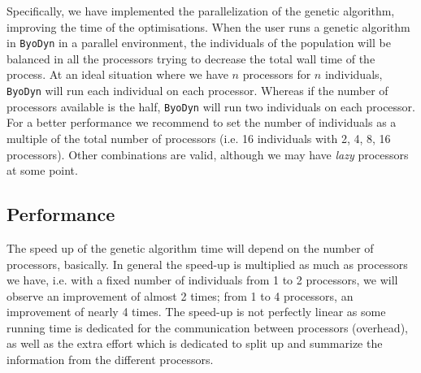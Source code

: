 \documentclass[a4paper, 11pt]{article}
\begin{document}
Specifically, we have implemented the parallelization of the genetic algorithm, improving the time of the optimisations. When the user runs a genetic algorithm in \texttt{ByoDyn} in a parallel environment, the individuals of the population will be balanced in all the processors trying to decrease the total wall time of the process.
At an ideal situation where we have $n$ processors for $n$ individuals, \texttt{ByoDyn} will run each individual on each processor.  
Whereas if the number of processors available is the half, \texttt{ByoDyn} will run two individuals on each processor. 
For a better performance we recommend to set the number of individuals as a multiple of the total number of processors (i.e. 16 individuals with 2, 4, 8, 16 processors). 
Other combinations are valid, although we may have \emph{lazy} processors at some point.  
\subsection{Performance}
The speed up of the genetic algorithm time will depend on the number of processors, basically. 
In general the speed-up is multiplied as much as processors we have, i.e. with a fixed number of individuals from 1 to 2 processors, we will observe an improvement of almost 2 times; from 1 to 4 processors, an improvement of nearly 4 times. 
The speed-up is not perfectly linear as some running time is dedicated for the communication between processors (overhead), as well as the extra effort which is dedicated to split up and summarize the information from the different processors. 
\end{document}

